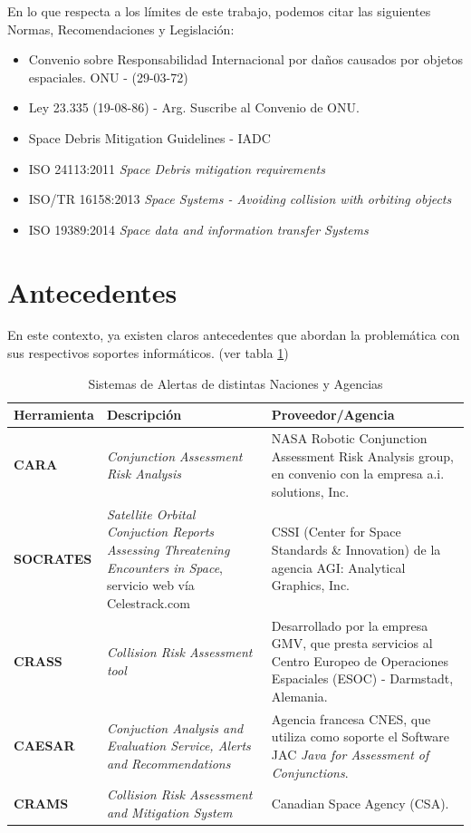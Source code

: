 En lo que respecta a los l\'imites de este trabajo, podemos citar las siguientes Normas, Recomendaciones y Legislaci\'on:\\

\begin{itemize}
\item {\small{Convenio sobre Responsabilidad Internacional por da\~nos causados por objetos espaciales. ONU - (29-03-72)}}
\item {\small{Ley 23.335 (19-08-86) - Arg. Suscribe al Convenio de ONU.}}
\item {\small{Space Debris Mitigation Guidelines - IADC}}
\item {\small{ISO 24113:2011 {\it{Space Debris mitigation requirements}}}}
\item {\small{ISO/TR 16158:2013 {\it{Space Systems - Avoiding collision with orbiting objects}}}}
\item {\small{ISO 19389:2014 {\it{Space data and information transfer Systems}}}}

\end{itemize}

\section{Antecedentes}
En este contexto, ya existen claros antecedentes que abordan la problem\'atica con sus respectivos soportes inform\'aticos. (ver tabla \ref{tab:sisal})
\begin{table}[!h]
\centering
\begin{tabular}{|l|p{5cm}|p{6cm}|}
\hline
Herramienta & Descripci\'on & Proveedor/Agencia\\
\hline
{\bf{CARA}} & {\it{Conjunction Assessment Risk Analysis}} & NASA Robotic Conjunction Assessment Risk Analysis group, en convenio con la empresa a.i. solutions, Inc.\\
\hline
{\bf{SOCRATES}} & {\it{Satellite Orbital Conjuction Reports Assessing Threatening Encounters in Space}}, servicio web v\'ia Celestrack.com & CSSI (Center for Space Standards \& Innovation) de la agencia AGI: Analytical Graphics, Inc.\\
\hline
{\bf{CRASS}} & {\it{Collision Risk Assessment tool}} & Desarrollado por la
empresa GMV, que presta servicios al Centro Europeo de Operaciones
Espaciales (ESOC) - Darmstadt, Alemania. \cite{alarconRodriguez}\\
\hline
{\bf{CAESAR}} & {\it{Conjuction Analysis and Evaluation Service, Alerts and Recommendations}} & Agencia francesa CNES, que utiliza como soporte el Software JAC {\it{Java for Assessment of Conjunctions}}. \cite{laporte}\\
\hline
{\bf{CRAMS}} & {\it{Collision Risk Assessment and Mitigation System}} & Canadian Space Agency (CSA). \cite{babiker}\\
\hline
\end{tabular}
\caption[Sistemas de Alerta]{Sistemas de Alertas de distintas Naciones y Agencias}
\label{tab:sisal}
\end{table}

